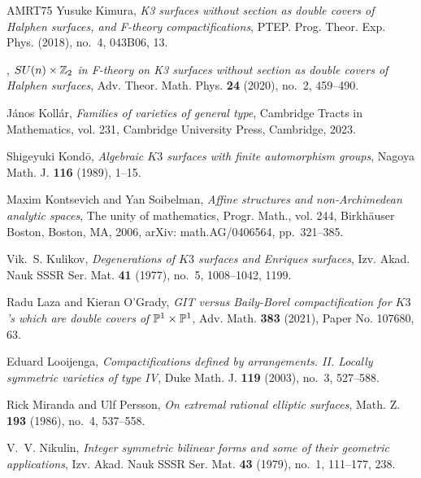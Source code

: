 \documentclass{amsart}
\begin{document}
\begin{thebibliography}{AMRT75}
Yusuke Kimura, \emph{K3 surfaces without section as double covers of {H}alphen
  surfaces, and {F}-theory compactifications}, PTEP. Prog. Theor. Exp. Phys.
  (2018), no.~4, 043B06, 13. 

\bysame, \emph{{$SU(n)\times\Bbb Z_2$} in {F}-theory on {K}3 surfaces without
  section as double covers of {H}alphen surfaces}, Adv. Theor. Math. Phys.
  \textbf{24} (2020), no.~2, 459--490. 

J\'{a}nos Koll\'{a}r, \emph{Families of varieties of general type}, Cambridge
  Tracts in Mathematics, vol. 231, Cambridge University Press, Cambridge, 2023.

Shigeyuki Kond{\=o}, \emph{Algebraic {$K3$} surfaces with finite automorphism
  groups}, Nagoya Math. J. \textbf{116} (1989), 1--15. 

Maxim Kontsevich and Yan Soibelman, \emph{{A}ffine structures and
  non-{A}rchimedean analytic spaces}, The unity of mathematics, Progr. Math.,
  vol. 244, Birkh\"auser Boston, Boston, MA, 2006, arXiv: math.AG/0406564,
  pp.~321--385. 

Vik.~S. Kulikov, \emph{Degenerations of {$K3$} surfaces and {E}nriques
  surfaces}, Izv. Akad. Nauk SSSR Ser. Mat. \textbf{41} (1977), no.~5,
  1008--1042, 1199. 

Radu Laza and Kieran O'Grady, \emph{G{IT} versus {B}aily-{B}orel
  compactification for {$K3$}'s which are double covers of {$\Bbb P^1\times\Bbb
  P^1$}}, Adv. Math. \textbf{383} (2021), Paper No. 107680, 63. 

Eduard Looijenga, \emph{Compactifications defined by arrangements. {II}.
  {L}ocally symmetric varieties of type {IV}}, Duke Math. J. \textbf{119}
  (2003), no.~3, 527--588. 

Rick Miranda and Ulf Persson, \emph{On extremal rational elliptic surfaces},
  Math. Z. \textbf{193} (1986), no.~4, 537--558. 

V.~V. Nikulin, \emph{Integer symmetric bilinear forms and some of their
  geometric applications}, Izv. Akad. Nauk SSSR Ser. Mat. \textbf{43} (1979),
  no.~1, 111--177, 238. 


\end{thebibliography}
\end{document}
